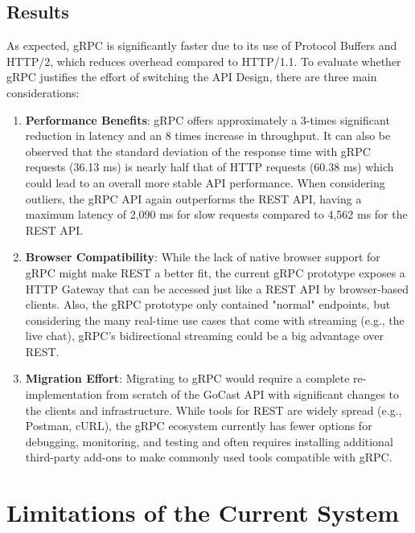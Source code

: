 \subsection{Results}

As expected, \ac{gRPC} is significantly faster due to its use of Protocol Buffers and HTTP/2, which reduces overhead compared to HTTP/1.1. To evaluate whether \ac{gRPC} justifies the effort of switching the \ac{API} Design, there are three main considerations:

\begin{enumerate}
    \item \textbf{Performance Benefits}: \ac{gRPC} offers approximately a 3-times significant reduction in latency and an 8 times increase in throughput. It can also be observed that the standard deviation of the response time with \ac{gRPC} requests (36.13 ms) is nearly half that of HTTP requests (60.38 ms) which could lead to an overall more stable \ac{API} performance.  When considering outliers, the \ac{gRPC} \ac{API} again outperforms the \ac{REST} \ac{API}, having a maximum latency of 2,090 ms for slow requests compared to 4,562 ms for the \ac{REST} \ac{API}.

    \item \textbf{Browser Compatibility}: While the lack of native browser support for \ac{gRPC} might make \ac{REST} a better fit, the current \ac{gRPC} prototype exposes a HTTP Gateway that can be accessed just like a \ac{REST} \ac{API} by browser-based clients. Also, the \ac{gRPC} prototype only contained "normal" endpoints, but considering the many real-time use cases that come with streaming (e.g., the live chat), \ac{gRPC}’s bidirectional streaming could be a big advantage over \ac{REST}.

    \item \textbf{Migration Effort}: Migrating to \ac{gRPC} would require a complete re-implementation from scratch of the GoCast \ac{API} with significant changes to the clients and infrastructure. While tools for \ac{REST} are widely spread (e.g., Postman, cURL), the \ac{gRPC} ecosystem currently has fewer options for debugging, monitoring, and testing and often requires installing additional third-party add-ons to make commonly used tools compatible with \ac{gRPC}.
\end{enumerate}

\section{Limitations of the Current System}

